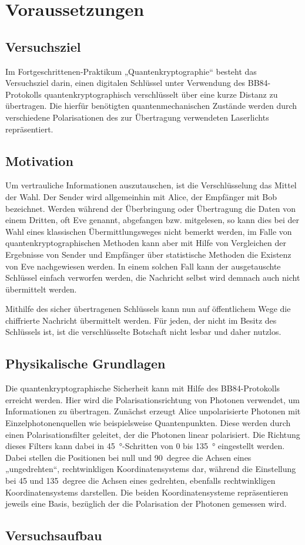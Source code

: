 \section{Voraussetzungen}

\subsection{Versuchsziel}

Im Fortgeschrittenen-Praktikum „Quantenkryptographie“ besteht das Versuchsziel
darin, einen digitalen Schlüssel unter Verwendung des BB84-Protokolls
quantenkryptographisch verschlüsselt über eine kurze Distanz zu übertragen.
Die hierfür benötigten quantenmechanischen Zustände werden durch verschiedene
Polarisationen des zur Übertragung verwendeten Laserlichts repräsentiert.

\subsection{Motivation}

Um vertrauliche Informationen auszutauschen, ist die Verschlüsselung das
Mittel der Wahl. Der Sender wird allgemeinhin mit Alice, der Empfänger mit Bob
bezeichnet. Werden während der Überbringung oder Übertragung die Daten von
einem Dritten, oft Eve genannt, abgefangen bzw. mitgelesen, so kann dies bei
der Wahl eines klassischen Übermittlungsweges nicht bemerkt werden, im Falle
von quantenkryptographischen Methoden kann aber mit Hilfe von Vergleichen der
Ergebnisse von Sender und Empfänger über statistische Methoden die Existenz
von Eve nachgewiesen werden. In einem solchen Fall kann der ausgetauschte
Schlüssel einfach verworfen werden, die Nachricht selbst wird demnach auch
nicht übermittelt werden.

Mithilfe des sicher übertragenen Schlüssels kann nun auf öffentlichem Wege die
chiffrierte Nachricht übermittelt werden. Für jeden, der nicht im Besitz des
Schlüssels ist, ist die verschlüsselte Botschaft nicht lesbar und daher nutzlos.


\subsection{Physikalische Grundlagen}

Die quantenkryptographische Sicherheit kann mit Hilfe des BB84-Protokolls
erreicht werden. Hier wird die Polarisationsrichtung von Photonen verwendet, um
Informationen zu übertragen. Zunächst erzeugt Alice unpolarisierte Photonen mit
Einzelphotonenquellen wie beispielsweise Quantenpunkten. Diese werden durch
einen Polarisationsfilter geleitet, der die Photonen linear polarisiert. Die
Richtung dieses Filters kann dabei in \SI{45}{\degree}-Schritten von 0 bis
\SI{135}{\degree} eingestellt werden. Dabei stellen die Positionen bei null und
\SI{90}{degree} die Achsen eines „ungedrehten“, rechtwinkligen
Koordinatensystems dar, während die Einstellung bei 45 und \SI{135}{degree} die
Achsen eines gedrehten, ebenfalls rechtwinkligen Koordinatensystems darstellen.
Die beiden Koordinatensysteme repräsentieren jeweils eine Basis, bezüglich der
die Polarisation der Photonen gemessen wird. 

\subsection{Versuchsaufbau}